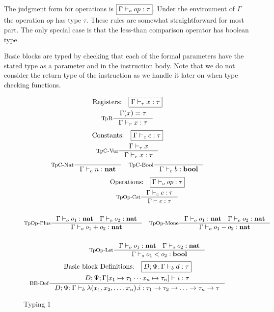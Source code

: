 \documentclass[a4paper, oneside, 10pt, draft]{memoir}
\begin{document}
The judgment form for operations is $\boxed{\Gamma |-_{o} op :
  \tau}$. Under the environment of $\Gamma$ the operation $op$ has
type $\tau$. These rules are somewhat straightforward for most
part. The only special case is that the less-than comparison operator
has boolean type.

Basic blocks are typed by checking that each of the formal parameters
have the stated type as a parameter and in the instruction body. Note
that we do not consider the return type of the instruction as we
handle it later on when type checking functions.

\begin{figure}
  \begin{gather*}
    \text{Registers:} \quad \boxed{\Gamma \tpr x : \tau}\\
    \inference[TpR]{\Gamma(x) = \tau}{\Gamma \tpr x : \tau}
  \end{gather*}
  \begin{gather*}
    \text{Constants:} \quad \boxed{\Gamma \tpc c : \tau}\\
    \inference[TpC-Var]{\Gamma \tpr x}{\Gamma \tpc x : \tau}\\
    \inference[TpC-Nat]{}{\Gamma \tpc n : \tnat} \quad
    \inference[TpC-Bool]{}{\Gamma \tpc b : \tbool}
  \end{gather*}
  \begin{gather*}
    \text{Operations:} \quad \boxed{\Gamma \tpop op : \tau} \\
    \inference[TpOp-Cst]{\Gamma \tpc c : \tau}{\Gamma |- c : \tau}\\\\
    \inference[TpOp-Plus]{\Gamma \tpop o_1 : \tnat \quad \Gamma
      \tpop o_2 : \tnat}{\Gamma \tpop o_1 + o_2 : \tnat} \quad
    \inference[TpOp-Mone]{\Gamma \tpop o_1 : \tnat \quad \Gamma
      \tpop o_2 : \tnat}{\Gamma \tpop o_1 - o_2 : \tnat}\\\\
    \inference[TpOp-Let]{\Gamma \tpop o_1 : \tnat \quad \Gamma
      \tpop o_2 : \tnat}{\Gamma \tpop o_1 < o_2 : \tbool}
  \end{gather*}
  \begin{gather*}
    \text{Basic block Definitions:} \quad \boxed{D;\Psi;\Gamma \tpb d
      : \tau}\\
    \inference[BB-Def]{D;\Psi;\Gamma[x_1 \mapsto \tau_1 \dotsb x_n \mapsto \tau_n] |- i :
  \tau}{D;\Psi;\Gamma \tpb \lambda(x_1, x_2, \dotsc,
      x_n).i : \tau_1 -> \tau_2 -> \dotsc -> \tau_n -> \tau}
  \end{gather*}
  \caption{Typing 1}
  \label{fig:type-judgement-1}
\end{figure}
\end{document}
